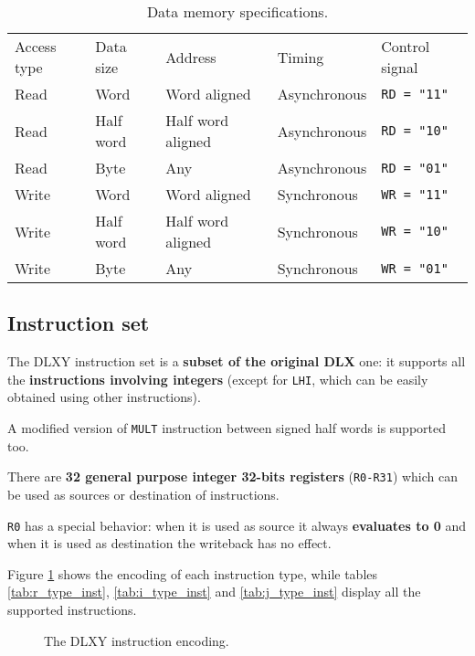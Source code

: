 \begin{table}[H]
	\centering
	\begin{tabular}{lllll}
		\hline
		\rowcolor{gray!50}
		Access type & Data size & Address & Timing & Control signal \\
		Read & Word & Word aligned & Asynchronous & \texttt{RD = "11"} \\
		\rowcolor{gray!25}
		Read & Half word & Half word aligned & Asynchronous & \texttt{RD = "10"} \\
		Read & Byte & Any & Asynchronous & \texttt{RD = "01"} \\
		\rowcolor{gray!25}
		Write & Word & Word aligned & Synchronous & \texttt{WR = "11"} \\
		Write & Half word & Half word aligned & Synchronous & \texttt{WR = "10"} \\
		\rowcolor{gray!25}
		Write & Byte & Any & Synchronous & \texttt{WR = "01"} \\
		\hline
	\end{tabular}
	\caption{Data memory specifications.}
	\label{tab:d_mem_specs}
\end{table}

\subsection{Instruction set}
The DLXY instruction set is a \textbf{subset of the original DLX} one:
it supports all the \textbf{instructions involving integers} (except for
\texttt{LHI}, which can be easily obtained using other instructions).

A modified version of \texttt{MULT} instruction between signed half words is
supported too.

\bigskip
There are \textbf{32 general purpose integer 32-bits registers} (\texttt{R0-R31})
which can be used as sources or destination of instructions.

\texttt{R0} has a special behavior: when it is used as source it always
\textbf{evaluates to 0} and when it is used as destination the writeback
has no effect.

\bigskip
Figure \ref{fig:encoding} shows the encoding of each instruction type, while
tables \ref{tab:r_type_inst}, \ref{tab:i_type_inst} and \ref{tab:j_type_inst}
display all the supported instructions.

\begin{figure}[H]
	\centering
	\caption{The DLXY instruction encoding.}
	\label{fig:encoding}
\end{figure}

